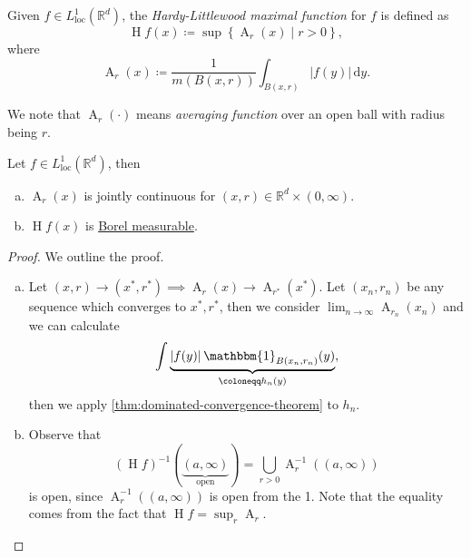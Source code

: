 \begin{definition}\label{def:HL-maximal-function}
	Given \(f\in L^1_{\text{loc} }(\mathbb{R} ^d)\), the \emph{Hardy-Littlewood maximal function} for \(f\) is defined as
	\[
		\operatorname{H}f(x) \coloneqq \sup \left\{\operatorname{A}_r(x)\mid r > 0\right\},
	\]
	where
	\[
		\operatorname{A}_r(x) \coloneqq \frac{1}{m(B(x, r))}\int _{B(x, r)} \left\vert f(y) \right\vert \,\mathrm{d}y.
	\]
\end{definition}
\begin{note}
	We note that \(\operatorname{A}_r(\cdot) \) means \emph{averaging function} over an open ball with radius being \(r\).
\end{note}
\begin{lemma}\label{lma:lec21}
	Let \(f\in L^1_{\text{loc} }(\mathbb{R} ^d)\), then
	\begin{enumerate}[(a)]
		\item \(\operatorname{A}_r(x)\) is jointly continuous for \((x, r)\in \mathbb{R} ^d \times (0, \infty )\).
		\item \(\operatorname{H}f(x) \) is \hyperref[def:Borel-measurable-function]{Borel measurable}.
	\end{enumerate}
\end{lemma}
\begin{proof}
	We outline the proof.
	\begin{enumerate}[(a)]
		\item Let \((x, r)\to (x^\ast, r^\ast)\implies \operatorname{A}_r(x)\to \operatorname{A}_{r^\ast}(x^\ast)\). Let \((x_{n} , r_{n} )\) be any sequence which converges to
		      \(x^\ast, r^\ast\), then we consider \(\lim_{n \to \infty} \operatorname{A}_{r_{n} }(x_{n} )\) and we can calculate
		      \[
			      \int\underbrace{\left\vert f(y) \right\vert \mathbbm{1}_{B(x_{n} , r_{n} )} (y)}_{\coloneqq h_{n} (y)},
		      \]
		      then we apply \autoref{thm:dominated-convergence-theorem} to \(h_{n} \).
		\item Observe that
		      \[
			      (\operatorname{H}f)^{-1} (\underbrace{(a, \infty )}_{\text{open} }) = \bigcup_{r>0} \operatorname{A}_{r} ^{-1} \left((a, \infty )\right)
		      \]
		      is open, since \(\operatorname{A} _{r} ^{-1} \left((a, \infty )\right)\) is open from the 1. Note that the equality comes from the fact that \(\operatorname{H}f = \sup_{r} \operatorname{A} _{r} \).
	\end{enumerate}
\end{proof}


